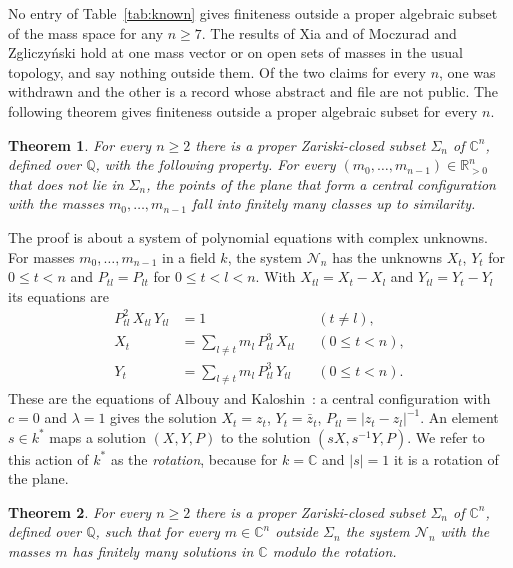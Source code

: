 \documentclass[11pt]{amsart}
\newtheorem{theorem}{Theorem}[section]
\theoremstyle{definition}
\theoremstyle{remark}
\numberwithin{equation}{section}
\newcommand{\QQ}{\mathbb{Q}}
\newcommand{\CC}{\mathbb{C}}
\newcommand{\RR}{\mathbb{R}}
\newcommand{\cN}{\mathcal{N}}
\begin{document}
No entry of Table~\ref{tab:known} gives finiteness outside a proper algebraic subset of the mass space
for any $n \ge 7$. The results of Xia and of Moczurad and Zgliczy\'nski hold at one mass vector or on
open sets of masses in the usual topology, and say nothing outside them. Of the two claims for every $n$, one was withdrawn and the other is a record whose
abstract and file are not public. The following theorem gives finiteness outside a proper algebraic
subset for every $n$.

\begin{theorem}\label{thm:main}
For every $n \ge 2$ there is a proper Zariski-closed subset $\Sigma_n$ of $\CC^n$, defined over $\QQ$,
with the following property. For every $(m_0, \dots, m_{n-1}) \in \RR_{>0}^n$ that does not lie in
$\Sigma_n$, the points of the plane that form a central configuration with the masses
$m_0, \dots, m_{n-1}$ fall into finitely many classes up to similarity.
\end{theorem}

The proof is about a system of polynomial equations with complex unknowns. For masses $m_0, \dots, m_{n-1}$ in
a field $k$, the system $\cN_n$ has the unknowns $X_t$, $Y_t$ for $0 \le t < n$ and $P_{tl} = P_{lt}$ for
$0 \le t < l < n$. With $X_{tl} = X_t - X_l$ and $Y_{tl} = Y_t - Y_l$ its equations are
\begin{align}
  P_{tl}^2\, X_{tl}\, Y_{tl} &= 1 && (t \ne l), \label{eq:N1}\\
  X_t &= \sum_{l \ne t} m_l\, P_{tl}^3\, X_{tl} && (0 \le t < n), \label{eq:N2}\\
  Y_t &= \sum_{l \ne t} m_l\, P_{tl}^3\, Y_{tl} && (0 \le t < n). \label{eq:N3}
\end{align}
These are the equations of Albouy and Kaloshin~\cite{albouykaloshin2012}: a central configuration with
$c = 0$ and $\lambda = 1$ gives the solution $X_t = z_t$, $Y_t = \bar z_t$, $P_{tl} = |z_t - z_l|^{-1}$.
An element $s \in k^{*}$ maps a solution $(X, Y, P)$ to the solution $(sX, s^{-1}Y, P)$. We refer to
this action of $k^{*}$ as the \emph{rotation}, because for $k = \CC$ and $|s| = 1$ it is a rotation of
the plane.

\begin{theorem}\label{thm:Nn}
For every $n \ge 2$ there is a proper Zariski-closed subset $\Sigma_n$ of $\CC^n$, defined over $\QQ$,
such that for every $m \in \CC^n$ outside $\Sigma_n$ the system $\cN_n$ with the masses $m$ has finitely
many solutions in $\CC$ modulo the rotation.
\end{theorem}
\end{document}
